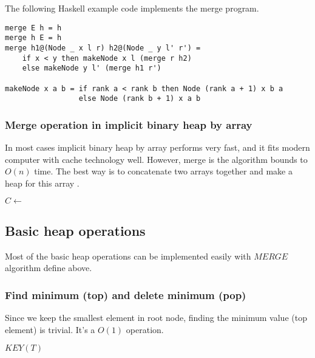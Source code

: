 \documentclass{article}
\begin{document}
The following Haskell example code implements the merge program.

\lstset{language=Haskell}
\begin{lstlisting}
merge E h = h
merge h E = h
merge h1@(Node _ x l r) h2@(Node _ y l' r') =
    if x < y then makeNode x l (merge r h2)
    else makeNode y l' (merge h1 r')

makeNode x a b = if rank a < rank b then Node (rank a + 1) x b a
                 else Node (rank b + 1) x a b
\end{lstlisting}

\subsubsection{Merge operation in implicit binary heap by array}

In most cases implicit binary heap by array performs very fast, and
it fits modern computer with cache technology well. However, merge
is the algorithm bounds to $O(n)$ time. The best way is to
concatenate two arrays together and make a heap for this array \cite{NIST}.

\begin{algorithmic}[1]
  \State $C \gets$ 
  \State {}
\EndFunction
\end{algorithmic}

\subsection{Basic heap operations}

Most of the basic heap operations can be implemented easily with $MERGE$
algorithm define above.

\subsubsection{Find minimum (top) and delete minimum (pop)}
Since we keep the smallest element in root node, finding the minimum
value (top element) is trivial. It's a $O(1)$ operation.

\begin{algorithmic}[1]
  \State \Return $KEY(T)$
\EndFunction
\end{algorithmic}
\end{document}
